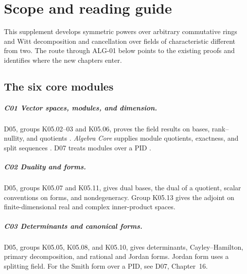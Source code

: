 \chapter*{Scope and reading guide}

This supplement develops symmetric powers over arbitrary commutative
rings and Witt decomposition and cancellation over fields of
characteristic different from two. The route through ALG-01 below
points to the existing proofs and identifies where the new chapters
enter.

{\setlength{\fboxsep}{0.8em}\setlength{\fboxrule}{0.35pt}%
\noindent{}\par}

\section*{The six core modules}

\paragraph{C01 \enspace Vector spaces, modules, and dimension.}
D05, groups K05.02--03 and K05.06, proves the field results on bases,
rank--nullity, and quotients \cite{d05}.
\emph{Algebra Core} supplies module quotients, exactness, and split
sequences \cite[Ch.~1]{p103}. D07 treats modules over a PID \cite[Ch.~16]{d07}.

\paragraph{C02 \enspace Duality and forms.}
D05, groups K05.07 and K05.11, gives dual bases, the dual of a quotient,
scalar conventions on forms, and nondegeneracy.
Group K05.13 gives the adjoint on finite-dimensional real and complex
inner-product spaces.

\paragraph{C03 \enspace Determinants and canonical forms.}
D05, groups K05.05, K05.08, and K05.10, gives determinants, Cayley--Hamilton,
primary decomposition, and rational and Jordan forms.
Jordan form uses a splitting field. For the Smith form over a PID,
see D07, Chapter~16.

